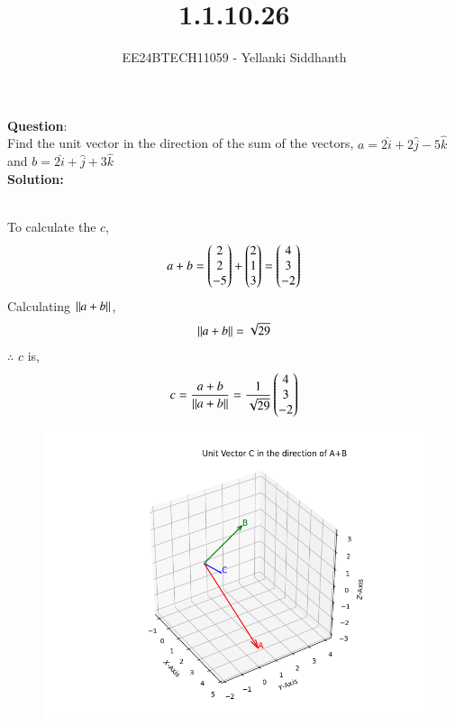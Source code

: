 \documentclass[journal]{IEEEtran}
\begin{document}
	
	
	\vspace{3cm}
	
	\title{1.1.10.26}
	\author{EE24BTECH11059 - Yellanki Siddhanth
	}
	{\let\newpage\relax\maketitle}
	
	\renewcommand{\thefigure}{\theenumi}
	\renewcommand{\thetable}{\theenumi}
	\setlength{\intextsep}{10pt} %
	
	
	\renewcommand{\thetable}{\theenumi}
	
	
	\textbf{Question}:\\
	Find the unit vector in the direction of the sum of the vectors, $a=2\hat{i}+2\hat{j}-5\hat{k}$ and $b = 2\hat{i} + \hat{j} + 3\hat{k}$
	\\ \textbf{Solution: }\\
	\begin{table}[h!]    
		\centering
		
		\caption{}
	\end{table}\\
	To calculate the $c$,
	\begin{align}
		a+b = \begin{pmatrix}2 \\ 2 \\ -5\end{pmatrix} + \begin{pmatrix}2 \\ 1\\3\end{pmatrix}  = \begin{pmatrix}4 \\ 3\\-2\end{pmatrix}\label{eq1.1.10.26.1}
	\end{align}
	Calculating $\left\lVert a+b\right\rVert$,
	\begin{align}
		\left\lVert a+b\right\rVert = \sqrt{29} \label{eq1.1.10.26.2}
	\end{align}
	$\therefore$ $c$ is,
	\begin{align}
		c = \frac{a+b}{\left\lVert a+b\right\rVert} = \frac{1}{\sqrt{29}}\begin{pmatrix}4 \\ 3\\-2\end{pmatrix} \label{eq1.1.10.26.3}
	\end{align}
	\begin{figure}[h]
		\centering
		\includegraphics[width=0.7\linewidth]{figs/fig1.png}
		\caption{}
		\label{graph}
	\end{figure}
	
	
	
\end{document}
